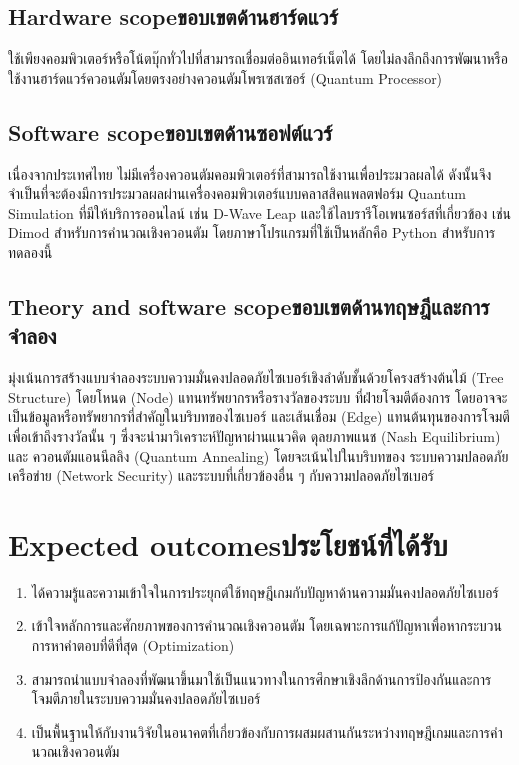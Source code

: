 \subsection{\ifenglish Hardware scope\else ขอบเขตด้านฮาร์ดแวร์\fi}
ใช้เพียงคอมพิวเตอร์หรือโน้ตบุ๊กทั่วไปที่สามารถเชื่อมต่ออินเทอร์เน็ตได้ โดยไม่ลงลึกถึงการพัฒนาหรือใช้งานฮาร์ดแวร์ควอนตัมโดยตรงอย่างควอนตัมโพรเซสเซอร์ (Quantum Processor)

\subsection{\ifenglish Software scope\else ขอบเขตด้านซอฟต์แวร์\fi}
เนื่องจากประเทศไทย ไม่มีเครื่องควอนตัมคอมพิวเตอร์ที่สามารถใช้งานเพื่อประมวลผลได้ ดังนั้นจึงจำเป็นที่จะต้องมีการประมวลผลผ่านเครื่องคอมพิวเตอร์แบบคลาสสิคแพลตฟอร์ม Quantum Simulation ที่มีให้บริการออนไลน์ เช่น D-Wave Leap และใช้ไลบรารีโอเพนซอร์สที่เกี่ยวข้อง เช่น Dimod สำหรับการคำนวณเชิงควอนตัม โดยภาษาโปรแกรมที่ใช้เป็นหลักคือ Python สำหรับการทดลองนี้

\subsection{\ifenglish Theory and software scope\else  ขอบเขตด้านทฤษฎีและการจำลอง\fi}
มุ่งเน้นการสร้างแบบจำลองระบบความมั่นคงปลอดภัยไซเบอร์เชิงลำดับชั้นด้วยโครงสร้างต้นไม้ (Tree Structure) โดยโหนด (Node) แทนทรัพยากรหรือรางวัลของระบบ ที่ฝ่ายโจมตีต้องการ โดยอาจจะเป็นข้อมูลหรือทรัพยากรที่สำคัญในบริบทของไซเบอร์ และเส้นเชื่อม (Edge) แทนต้นทุนของการโจมตีเพื่อเข้าถึงรางวัลนั้น ๆ ซึ่งจะนำมาวิเคราะห์ปัญหาผ่านแนวคิด ดุลยภาพแนช (Nash Equilibrium) และ ควอนตัมแอนนีลลิง (Quantum Annealing) โดยจะเน้นไปในบริบทของ ระบบความปลอดภัยเครือข่าย (Network Security) และระบบที่เกี่ยวข้องอื่น ๆ กับความปลอดภัยไซเบอร์

\section{\ifenglish Expected outcomes\else ประโยชน์ที่ได้รับ\fi}
\begin{enumerate}
    \item ได้ความรู้และความเข้าใจในการประยุกต์ใช้ทฤษฎีเกมกับปัญหาด้านความมั่นคงปลอดภัยไซเบอร์
    \item  เข้าใจหลักการและศักยภาพของการคำนวณเชิงควอนตัม โดยเฉพาะการแก้ปัญหาเพื่อหากระบวนการหาคำตอบที่ดีที่สุด (Optimization)
    \item สามารถนำแบบจำลองที่พัฒนาขึ้นมาใช้เป็นแนวทางในการศึกษาเชิงลึกด้านการป้องกันและการโจมตีภายในระบบความมั่นคงปลอดภัยไซเบอร์
    \item เป็นพื้นฐานให้กับงานวิจัยในอนาคตที่เกี่ยวข้องกับการผสมผสานกันระหว่างทฤษฎีเกมและการคำนวณเชิงควอนตัม
\end{enumerate}

